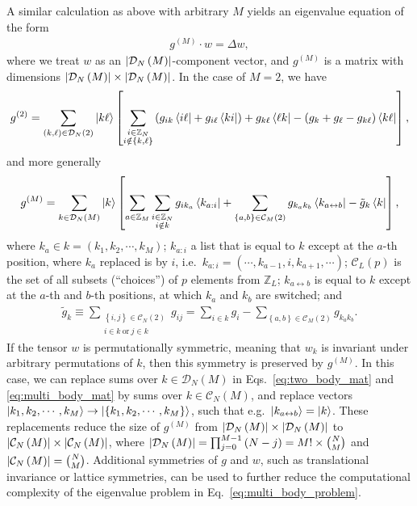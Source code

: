 \documentclass[nofootinbib,twocolumn]{revtex4-2}
\renewcommand{\t}{\text} %
\newcommand{\p}[1]{\left(#1\right)} %
\renewcommand{\sp}[1]{\left[#1\right]} %
\renewcommand{\set}[1]{\left\{#1\right\}} %
\renewcommand{\c}{\cdot} %
\renewcommand{\i}{\mathrm{i}\mkern1mu} %
\newcommand{\1}{\mathds{1}}
\newcommand{\ZZ}{\mathbb{Z}}
\newcommand{\C}{\mathcal{C}}
\newcommand{\D}{\mathcal{D}}
\begin{document}
A similar calculation as above with arbitrary $M$ yields an eigenvalue equation of the form
\begin{align}
  g^{(M)} \c w = \Delta w,
  \label{eq:multi_body_problem}
\end{align}
where we treat $w$ as an $\abs{\D_N\p{M}}$-component vector, and $g^{(M)}$ is a matrix with dimensions $\abs{\D_N\p{M}}\times\abs{\D_N\p{M}}$.
In the case of $M=2$, we have
\begin{align}
  g^{(2)} = \sum_{\p{k,\ell}\in\D_N\p{2}} \ket{k\ell}
  \sp{\sum_{\substack{i\in\ZZ_N\\i\notin\set{k,\ell}}}
    \p{ g_{ik} \bra{i\ell} + g_{i\ell} \bra{ki} }
    + g_{k\ell} \bra{\ell k}
    - \p{g_k + g_\ell - g_{k\ell}} \bra{k\ell}},
  \label{eq:two_body_mat}
\end{align}
and more generally
\begin{align}
  g^{(M)} = \sum_{k\in\D_N\p{M}} \ket{k}
  \sp{\sum_{a\in\ZZ_M} \sum_{\substack{i\in\ZZ_N\\i\notin k}}
    g_{ik_a} \bra{k_{a:i}}
    + \sum_{\set{a,b}\in\C_M\p{2}} g_{k_ak_b} \bra{k_{a\leftrightarrow b}}
    - \tilde g_k \bra{k}},
  \label{eq:multi_body_mat}
\end{align}
where $k_a\in k=\p{k_1,k_2,\cdots,k_M}$; $k_{a:i}$ a list that is equal to $k$ except at the $a$-th position, where $k_a$ replaced is by $i$, i.e.~$k_{a:i}=\p{\cdots,k_{a-1},i,k_{a+1},\cdots}$; $\C_L\p{p}$ is the set of all subsets (``choices'') of $p$ elements from $\ZZ_L$; $k_{a\leftrightarrow b}$ is equal to $k$ except at the $a$-th and $b$-th positions, at which $k_a$ and $k_b$ are switched; and
\begin{align}
  \tilde g_k
  \equiv \sum_{\substack{\set{i,j}\in\C_N\p{2}\\i\in k~\t{or}~j\in k}} g_{ij}
  = \sum_{i\in k} g_i - \sum_{\set{a,b}\in\C_M\p{2}} g_{k_ak_b}.
\end{align}
If the tensor $w$ is permutationally symmetric, meaning that $w_k$ is invariant under arbitrary permutations of $k$, then this symmetry is preserved by $g^{(M)}$.
In this case, we can replace sums over $k\in\D_N\p{M}$ in Eqs.~\eqref{eq:two_body_mat} and \eqref{eq:multi_body_mat} by sums over $k\in\C_N\p{M}$, and replace vectors $\ket{k_1,k_2,\cdots,k_M}\to\ket{\set{k_1,k_2,\cdots,k_M}}$, such that e.g.~$\ket{k_{a\leftrightarrow b}}=\ket{k}$.
These replacements reduce the size of $g^{(M)}$ from $\abs{\D_N\p{M}}\times\abs{\D_N\p{M}}$ to $\abs{\C_N\p{M}}\times\abs{\C_N\p{M}}$, where $\abs{\D_N\p{M}}=\prod_{j=0}^{M-1}\p{N-j}=M!\times{N\choose M}$ and $\abs{\C_N\p{M}}={N\choose M}$.
Additional symmetries of $g$ and $w$, such as translational invariance or lattice symmetries, can be used to further reduce the computational complexity of the eigenvalue problem in Eq.~\eqref{eq:multi_body_problem}.
\end{document}
